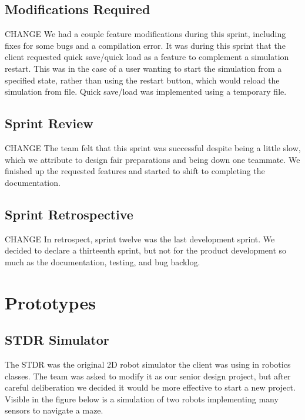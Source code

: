 \subsection{Modifications Required}
CHANGE
We had a couple feature modifications during this sprint, including fixes for some bugs and a compilation error. It was during this sprint that the client requested quick save/quick load as a feature to complement a simulation restart. This was in the case of a user wanting to start the simulation from a specified state, rather than using the restart button, which would reload the simulation from file. Quick save/load was implemented using a temporary file.

\subsection{Sprint Review}
CHANGE
The team felt that this sprint was successful despite being a little slow, which we attribute to design fair preparations and being down one teammate. We finished up the requested features and started to shift to completing the documentation.

\subsection{Sprint Retrospective}
CHANGE
In retrospect, sprint twelve was the last development sprint. We decided to declare a thirteenth sprint, but not for the product development so much as the documentation, testing, and bug backlog. 


\section{Prototypes}

\subsection{STDR Simulator}

The STDR was the original 2D robot simulator the client was using in robotics classes. The team was asked to modify it as our senior design project, but after careful deliberation we decided it would be more effective to start a new project. Visible in the figure below is a simulation of two robots implementing many sensors to navigate a maze.

